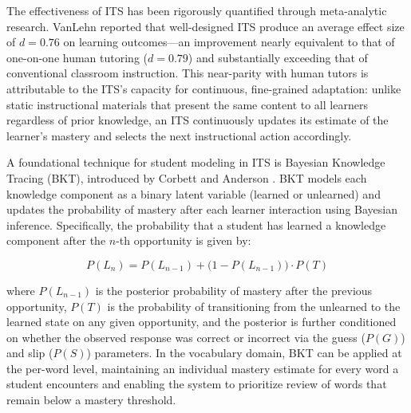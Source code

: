 The effectiveness of ITS has been rigorously quantified through meta-analytic research. VanLehn \cite{VanLehn2011} reported that well-designed ITS produce an average effect size of $d = 0.76$ on learning outcomes---an improvement nearly equivalent to that of one-on-one human tutoring ($d = 0.79$) and substantially exceeding that of conventional classroom instruction. This near-parity with human tutors is attributable to the ITS's capacity for continuous, fine-grained adaptation: unlike static instructional materials that present the same content to all learners regardless of prior knowledge, an ITS continuously updates its estimate of the learner's mastery and selects the next instructional action accordingly.

A foundational technique for student modeling in ITS is Bayesian Knowledge Tracing (BKT), introduced by Corbett and Anderson \cite{Corbett1994}. BKT models each knowledge component as a binary latent variable (learned or unlearned) and updates the probability of mastery after each learner interaction using Bayesian inference. Specifically, the probability that a student has learned a knowledge component after the $n$-th opportunity is given by:

\begin{equation}
\label{eq:bkt}
P(L_n) = P(L_{n-1}) + \big(1 - P(L_{n-1})\big) \cdot P(T)
\end{equation}

\noindent where $P(L_{n-1})$ is the posterior probability of mastery after the previous opportunity, $P(T)$ is the probability of transitioning from the unlearned to the learned state on any given opportunity, and the posterior is further conditioned on whether the observed response was correct or incorrect via the guess ($P(G)$) and slip ($P(S)$) parameters. In the vocabulary domain, BKT can be applied at the per-word level, maintaining an individual mastery estimate for every word a student encounters and enabling the system to prioritize review of words that remain below a mastery threshold.

